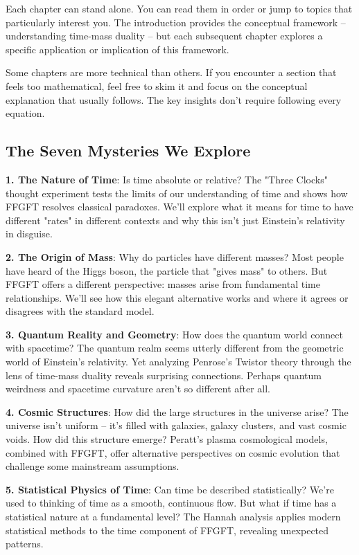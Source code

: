 \documentclass[11pt,oneside]{book}
\begin{document}
	Each chapter can stand alone. You can read them in order or jump to topics that particularly interest you. The introduction provides the conceptual framework – understanding time-mass duality – but each subsequent chapter explores a specific application or implication of this framework.
	
	Some chapters are more technical than others. If you encounter a section that feels too mathematical, feel free to skim it and focus on the conceptual explanation that usually follows. The key insights don't require following every equation.
	
	\subsection*{The Seven Mysteries We Explore}
	
	\textbf{1. The Nature of Time}: Is time absolute or relative? The "Three Clocks" thought experiment tests the limits of our understanding of time and shows how FFGFT resolves classical paradoxes. We'll explore what it means for time to have different "rates" in different contexts and why this isn't just Einstein's relativity in disguise.
	
	\textbf{2. The Origin of Mass}: Why do particles have different masses? Most people have heard of the Higgs boson, the particle that "gives mass" to others. But FFGFT offers a different perspective: masses arise from fundamental time relationships. We'll see how this elegant alternative works and where it agrees or disagrees with the standard model.
	
	\textbf{3. Quantum Reality and Geometry}: How does the quantum world connect with spacetime? The quantum realm seems utterly different from the geometric world of Einstein's relativity. Yet analyzing Penrose's Twistor theory through the lens of time-mass duality reveals surprising connections. Perhaps quantum weirdness and spacetime curvature aren't so different after all.
	
	\textbf{4. Cosmic Structures}: How did the large structures in the universe arise? The universe isn't uniform – it's filled with galaxies, galaxy clusters, and vast cosmic voids. How did this structure emerge? Peratt's plasma cosmological models, combined with FFGFT, offer alternative perspectives on cosmic evolution that challenge some mainstream assumptions.
	
	\textbf{5. Statistical Physics of Time}: Can time be described statistically? We're used to thinking of time as a smooth, continuous flow. But what if time has a statistical nature at a fundamental level? The Hannah analysis applies modern statistical methods to the time component of FFGFT, revealing unexpected patterns.
	
\end{document}
